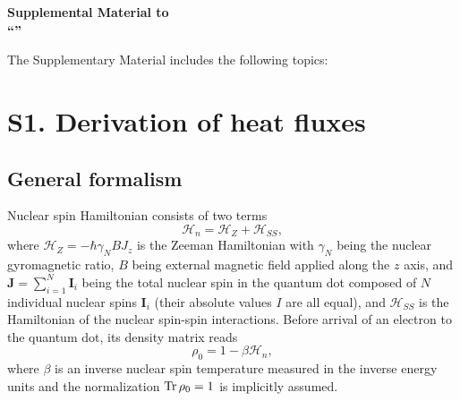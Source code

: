 \documentclass[prl,nobibnotes,twocolumn,aps,longbibliography,superscriptaddress,notoc]{revtex4-1}
\newcommand{\Tr}{\mathop{\rm Tr}}
\renewcommand{\i}{{\rm i}}
\let\oldsec\section
\renewcommand{\section}[1]{\textit{#1}---}
\begin{document}
\let\addcontentsline\oldaddcontentsline
\makeatletter
\renewcommand\tableofcontents{
    \@starttoc{toc}
}
\makeatother
\renewcommand{\i}{{\rm i}}

\onecolumngrid
\vspace{\columnsep}
\begin{center}

\makeatletter
{\large\bf{Supplemental Material to\\``\@title''}}
\makeatother
\end{center}
\vspace{\columnsep}

The Supplementary Material includes the following topics:

\hypersetup{linktoc=page}
\tableofcontents
\vspace{\columnsep}
\twocolumngrid

\renewcommand{\section}[1]{\oldsec{#1}}
\renewcommand{\thepage}{S\arabic{page}}
\renewcommand{\theequation}{S\arabic{equation}}

\renewcommand{\thefigure}{S\arabic{figure}}
\renewcommand{\bibnumfmt}[1]{[S#1]}
\renewcommand{\citenumfont}[1]{S#1}

\setcounter{page}{1}
\setcounter{section}{0}
\setcounter{equation}{0}
\setcounter{figure}{0}

\section{S1. Derivation of heat fluxes}
\label{sec:S1}

\subsection{General formalism}

Nuclear spin Hamiltonian consists of two terms
\begin{equation}
  \mathcal H_n=\mathcal H_Z+\mathcal H_{SS},
\end{equation}
where $\mathcal H_Z=-\hbar\gamma_NBJ_z$ is the Zeeman Hamiltonian with $\gamma_N$ being the nuclear gyromagnetic ratio, $B$ being external magnetic field applied along the $z$ axis, and $\bm J=\sum_{i=1}^N\bm I_i$ being the total nuclear spin in the quantum dot composed of $N$ individual nuclear spins $\bm I_i$ (their absolute values $I$ are all equal), and $\mathcal H_{SS}$ is the Hamiltonian of the nuclear spin-spin interactions. Before arrival of an electron to the quantum dot, its density matrix reads
\begin{equation}
  \label{eq:rho0_S}
  \rho_0=1-\beta\mathcal H_n,
\end{equation}
where $\beta$ is an inverse nuclear spin temperature measured in the inverse energy units and the normalization $\Tr\rho_0=1$ is implicitly assumed.
\end{document}
